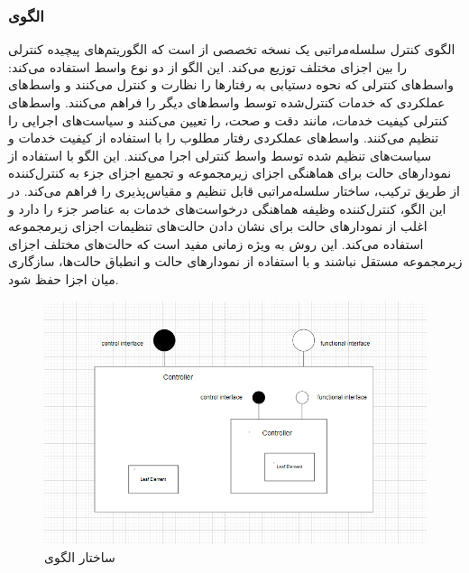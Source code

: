 \subsubsection{الگوی }
\label{archHierContSec}
\begin{RTL}
الگوی کنترل سلسله‌مراتبی \cite{ref4} یک
نسخه تخصصی از 
است که الگوریتم‌های پیچیده کنترلی را بین اجزای مختلف توزیع می‌کند.
این الگو از دو نوع واسط استفاده می‌کند:
واسط‌های کنترلی که نحوه دستیابی به رفتارها را نظارت و کنترل می‌کنند
و واسط‌های عملکردی که خدمات کنترل‌شده توسط واسط‌های دیگر را فراهم می‌کنند.
واسط‌های کنترلی کیفیت خدمات، مانند دقت و صحت، را تعیین می‌کنند
و سیاست‌های اجرایی را تنظیم می‌کنند. واسط‌های عملکردی رفتار مطلوب
را با استفاده از کیفیت خدمات و سیاست‌های تنظیم شده توسط واسط
کنترلی اجرا می‌کنند. این الگو با استفاده از نمودارهای حالت برای
هماهنگی اجزای زیرمجموعه و تجمیع اجزای جزء به کنترل‌کننده
از طریق ترکیب، ساختار سلسله‌مراتبی قابل تنظیم و مقیاس‌پذیری را
فراهم می‌کند. در این الگو، کنترل‌کننده وظیفه هماهنگی درخواست‌های
خدمات به عناصر جزء را دارد و اغلب از نمودارهای حالت برای نشان
دادن حالت‌های تنظیمات اجزای زیرمجموعه استفاده می‌کند. این روش
به ویژه زمانی مفید است که حالت‌های مختلف اجزای زیرمجموعه مستقل
نباشند و با استفاده از نمودارهای حالت و انطباق حالت‌ها، سازگاری میان اجزا حفظ شود.
\end{RTL}
\begin{figure}[h!]
\centering
\includegraphics[scale=0.5]{images/first/hierarchical.png}
\caption{ساختار الگوی }
\end{figure}